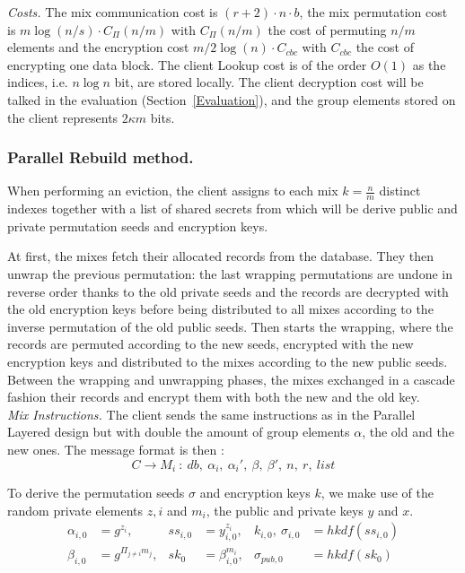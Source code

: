 \documentclass[USenglish,oneside,twocolumn]{article}
\begin{document}
\noindent\textit{Costs.} The mix communication cost is $ (r+2) \cdot n \cdot b$, the mix permutation cost is $m \log(n/s) \cdot C_{\Pi}(n/m)$ with $C_{\Pi}(n/m)$ the cost of permuting $n/m$ elements and the encryption cost $m/2 \log(n)\cdot  C_{cbc}$ with $C_{cbc}$ the cost of encrypting one data block. The client Lookup cost is of the order $O(1)$ as the indices, i.e. $n\log n$ bit, are stored locally. The client decryption cost will be talked in the evaluation (Section~\ref{Evaluation}), and the group elements stored on the client represents $2\kappa m$ bits.

\vspace{-.5cm}

\subsubsection{Parallel Rebuild method.}
When performing an eviction, the client assigns to each mix  $k=\frac{n}{m}$ distinct indexes together with a list of shared secrets from which will be derive public and private permutation seeds and encryption keys.

At first, the mixes fetch their allocated records from the database. They then unwrap the previous permutation: the last wrapping permutations are undone in reverse order thanks to the old private seeds and the records are decrypted with the old encryption keys before being distributed to all mixes according to the inverse permutation of the old public seeds. Then starts the wrapping, where the records are permuted according to the new seeds, encrypted with the new encryption keys and distributed to the mixes according to the new public seeds. Between the wrapping and unwrapping phases, the mixes exchanged in a cascade fashion their records and encrypt them with both the new and the old key.\\

\noindent\textit{Mix Instructions.}
The client sends the same instructions as in the Parallel Layered design but with double the amount of group elements $\alpha$, the old and the new ones. The message format is then : 
$$C \rightarrow M_i\ :\ db,\  \alpha_i,\ \alpha_i',\ \beta,\ \beta',\ n,\ r,\ list$$

To derive the permutation seeds $\sigma$ and encryption keys $k$, we make use of the random private elements $z,i$ and $m_i$, the public and private keys $y$ and $x$.
\begin{align*}
\alpha_{i,0} &= g^{z_i}, &ss_{i,0 }&= y_{i,0}^{z_i}, &k_{i,0},\ \sigma_{i,0}&=hkdf(ss_{i,0})\\
\beta_{i, 0} &= g^{\Pi_{j\neq i}m_j}, &sk_0 &= \beta_{i,0}^{m_i}, &\sigma_{pub, 0}&=hkdf( sk_0)
\end{align*}
\end{document}
